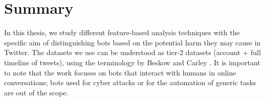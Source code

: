 \section{Summary}
In this thesis, we study different feature-based analysis techniques with the specific aim of distinguishing bots based on the potential harm they may cause in Twitter. The datasets we use can be understood as tier-2 datasets (account + full timeline of tweets), using the terminology by Beskow and Carley \cite{Beskow2018}. It is important to note that the work focuses on bots that interact with humans in online conversations; bots used for cyber attacks or for the automation of generic tasks are out of the scope.
